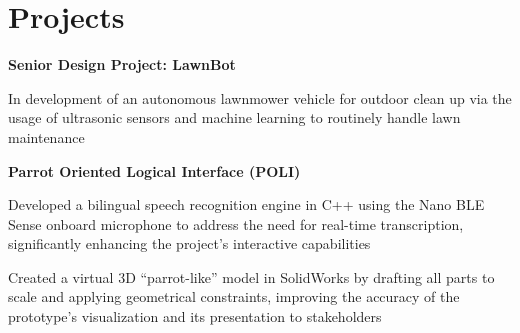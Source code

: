 \section{Projects}
    

    \vspace{0.2 cm}

    \begin{twocolentry}{}
        \textbf{Senior Design Project: LawnBot}
    \end{twocolentry}

    \vspace{0.10 cm}
    \begin{onecolentry}
        \begin{highlights}
            \item In development of an autonomous lawnmower vehicle for outdoor clean up via the usage of ultrasonic sensors and machine learning to routinely handle lawn maintenance
        \end{highlights}
    \end{onecolentry}
    
    \vspace{0.2 cm}

    \begin{twocolentry}{}
        \textbf{Parrot Oriented Logical Interface (POLI)}
    \end{twocolentry}

    \vspace{0.10 cm}
    \begin{onecolentry}
        \begin{highlights}
            \item Developed a bilingual speech recognition engine in C++ using the Nano BLE Sense onboard microphone to address the need for real-time transcription, significantly enhancing the project’s interactive capabilities
            \item Created a virtual 3D “parrot-like” model in SolidWorks by drafting all parts to scale and applying geometrical constraints, improving the accuracy of the prototype’s visualization and its presentation to stakeholders
        \end{highlights}
    \end{onecolentry}

